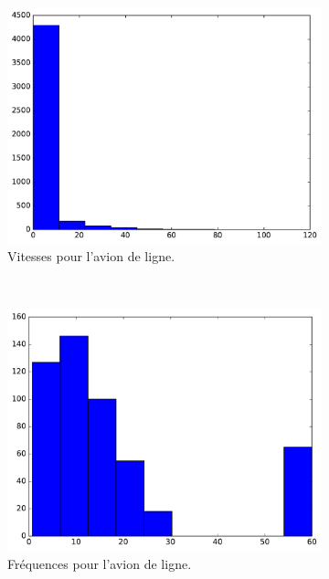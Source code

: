 	\begin{figure}[htb]
		\begin{subfigure}[t]{\subImgWaStats}
			\centering
			\includegraphics[width=\textwidth]{figures/ch3/chinaA_speed}
			\caption{Vitesses pour l'avion de ligne.}
			\label{fig:chinaA_speed}
		\end{subfigure}
		~
		\begin{subfigure}[t]{\subImgWaStats}
			\centering
			\includegraphics[width=\textwidth]{figures/ch3/chinaA_frequency}
			\caption{Fréquences pour l'avion de ligne.}
			\label{fig:chinaA_frequency}
		\end{subfigure}
		~
		\begin{subfigure}[t]{\subImgWaStats}

\end{subfigure}
\end{figure}
